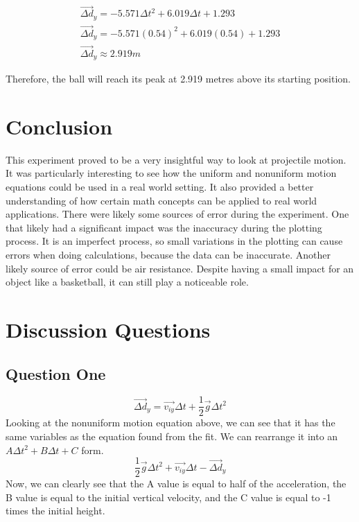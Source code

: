 \documentclass[10pt,twocolumn,letterpaper]{article}
\begin{document}
\begin{align}
\nonumber\overrightarrow{\Delta d}_{y}=-5.571\Delta t^2+6.019\Delta t+1.293\\
\nonumber\overrightarrow{\Delta d}_{y}=-5.571(0.54)^2+6.019(0.54)+1.293\\
\nonumber\overrightarrow{\Delta d}_{y}\approx2.919m
\end{align}

Therefore, the ball will reach its peak at 2.919 metres above its starting position.

\section{Conclusion}
This experiment proved to be a very insightful way to look at projectile motion. It was particularly interesting to see how the uniform and nonuniform motion equations could be used in a real world setting. It also provided a better understanding of how certain math concepts can be applied to real world applications. There were likely some sources of error during the experiment. One that likely had a significant impact was the inaccuracy during the plotting process. It is an imperfect process, so small variations in the plotting can cause errors when doing calculations, because the data can be inaccurate. Another likely source of error could be air resistance. Despite having a small impact for an object like a basketball, it can still play a noticeable role.

\section{Discussion Questions}
\subsection{Question One}
\begin{equation}
    \nonumber\overrightarrow{\Delta d}_{y}=\overrightarrow{v_{iy}}\Delta t+\frac{1}{2}\overrightarrow{g}\Delta t^2
\end{equation}
Looking at the nonuniform motion equation above, we can see that it has the same variables as the equation found from the fit. We can rearrange it into an \(A\Delta t^2+B\Delta t+C\) form.
\begin{equation}
    \nonumber\frac{1}{2}\overrightarrow{g}\Delta t^2+\overrightarrow{v_{iy}}\Delta t-\overrightarrow{\Delta d}_{y}
\end{equation}
Now, we can clearly see that the A value is equal to half of the acceleration, the B value is equal to the initial vertical velocity, and the C value is equal to -1 times the initial height. 
\end{document}
